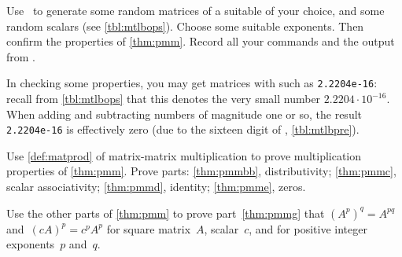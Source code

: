 \begin{exercise}  
Use \script\ to generate some random matrices of a suitable  of your choice, and some random scalars (see \cref{tbl:mtlbops}).
Choose some suitable exponents.
Then confirm the  properties of \cref{thm:pmm}.
Record all your commands and the output from \script.

In checking some properties, you may get matrices with  such as \verb|2.2204e-16|: recall from \cref{tbl:mtlbops} that this denotes the very small number \(2.2204\cdot10^{-16}\). 
When adding and subtracting numbers of magnitude one or so, the result \verb|2.2204e-16| is effectively zero (due to the sixteen digit  of \script, \cref{tbl:mtlbpre}).
\end{exercise}

\begin{exercise}  
Use \cref{def:matprod} of matrix-matrix multiplication to prove multiplication properties of \cref{thm:pmm}. 
Prove parts: \ref{thm:pmmbb}, distributivity; \ref{thm:pmmc}, scalar associativity; \ref{thm:pmmd}, identity; \ref{thm:pmme}, zeros.
\end{exercise}

\begin{exercise}  
Use the other parts of \cref{thm:pmm} to prove part~\ref{thm:pmmg} that \((A^p)^q=A^{pq}\) and~\((cA)^p=c^pA^p\) for square matrix~\(A\), scalar~\(c\), and for positive integer exponents~\(p\) and~\(q\).
\end{exercise}

